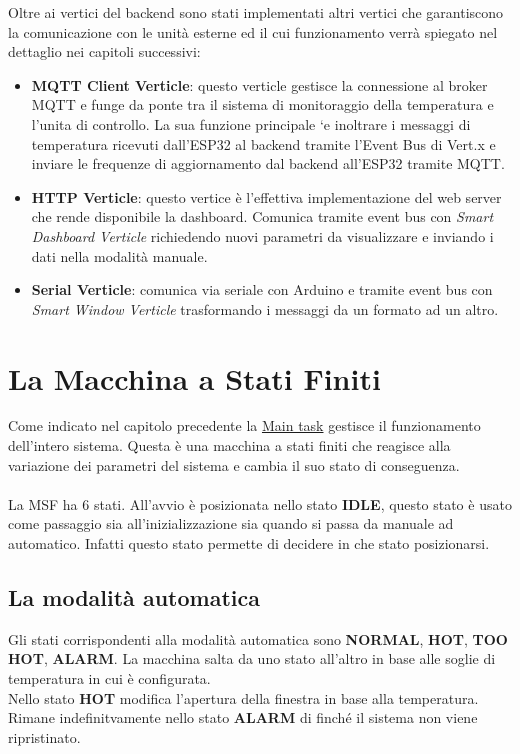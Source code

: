 \documentclass{report}
\begin{document}
Oltre ai vertici del backend sono stati implementati altri vertici che garantiscono la comunicazione con le unità esterne ed il cui funzionamento verrà spiegato nel dettaglio nei capitoli successivi:
\begin{itemize}
    \item {   
    \textbf{MQTT Client Verticle}: questo verticle gestisce la connessione al broker MQTT e funge da ponte tra il sistema di monitoraggio della temperatura e l'unita di controllo. La sua funzione principale `e inoltrare i messaggi di temperatura ricevuti dall'ESP32 al backend tramite l'Event Bus di Vert.x e inviare le frequenze di aggiornamento dal backend all'ESP32 tramite MQTT.
    }
    \item {
    \textbf{HTTP Verticle}: questo vertice è l'effettiva implementazione del web server che rende disponibile la dashboard. Comunica tramite event bus con \textit{Smart Dashboard Verticle} richiedendo nuovi parametri da visualizzare e inviando i dati nella modalità manuale.
    }
    \item {
    \textbf{Serial Verticle}: comunica via seriale con Arduino e tramite event bus con \textit{Smart Window Verticle} trasformando i messaggi da un formato ad un altro.
    }
\end{itemize}

\section{La Macchina a Stati Finiti}
Come indicato nel capitolo precedente la \hyperref[fig:main-task]{Main task} gestisce il funzionamento dell'intero sistema. Questa è una macchina a stati finiti che reagisce alla variazione dei parametri del sistema e cambia il suo stato di conseguenza. 
\\
\\
La MSF ha 6 stati. All'avvio è posizionata nello stato \textbf{IDLE}, questo stato è usato come passaggio sia all'inizializzazione sia quando si passa da manuale ad automatico. Infatti questo stato permette di decidere in che stato posizionarsi.

\subsection{La modalità automatica}

\par{
Gli stati corrispondenti alla modalità automatica sono \textbf{NORMAL}, \textbf{HOT}, \textbf{TOO HOT}, \textbf{ALARM}. La macchina salta da uno stato all'altro in base alle soglie di temperatura in cui è configurata. \\
Nello stato \textbf{HOT} modifica l'apertura della finestra in base alla temperatura. \\
Rimane indefinitvamente nello stato \textbf{ALARM} di finché il sistema non viene ripristinato.
}
\end{document}
